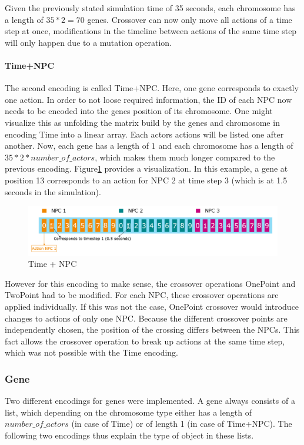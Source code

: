 Given the previously stated simulation time of 35 seconds, each chromosome has a length of $35 * 2 = 70$ genes.
Crossover can now only move all actions of a time step at once, modifications in the timeline between actions of the same time step will only happen due to a mutation operation.

\paragraph{Time+NPC}
The second encoding is called Time+NPC. Here, one gene corresponds to exactly one action. In order to not loose required information, the ID of each NPC now needs to be encoded into the genes position of its chromosome. One might visualize this as unfolding the matrix build by the genes and chromosome in encoding Time into a linear array. Each actors actions will be listed one after another. Now, each gene has a length of $1$ and each chromosome has a length of $35 * 2 * number\_of\_actors$, which makes them much longer compared to the previous encoding. Figure\ref{figure:encoding:chromosome:time_npc} provides a visualization. In this example, a gene at position 13 corresponds to an action for NPC 2 at time step 3 (which is at 1.5 seconds in the simulation).

\begin{figure}[ht] 
	\includegraphics[width=1\linewidth]{figures/time_npc_encoding}
	\caption{Time + NPC}
	\label{figure:encoding:chromosome:time_npc}
\end{figure}

However for this encoding to make sense, the crossover operations OnePoint and TwoPoint had to be modified. For each NPC, these crossover operations are applied individually. If this was not the case, OnePoint crossover would introduce changes to actions of only one NPC. Because the different crossover points are independently chosen, the position of the crossing differs between the NPCs. This fact allows the crossover operation to break up actions at the same time step, which was not possible with the Time encoding.

\subsubsection{Gene}
Two different encodings for genes were implemented. A gene always consists of a list, which depending on the chromosome type either has a length of $number\_of\_actors$ (in case of Time) or of length 1 (in case of Time+NPC). The following two encodings thus explain the type of object in these lists.

